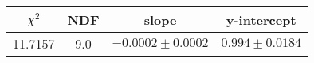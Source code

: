 \begin{tabular}{|c|c|c|c|}

\hline
$\chi^{2}$ & NDF & slope & y-intercept  \\
\hline
11.7157 & 9.0 & $-0.0002\pm0.0002$ & $0.994\pm0.0184$ \\
\hline

\end{tabular}